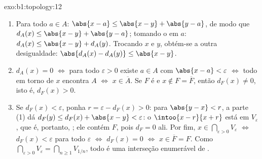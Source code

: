 \begin{solution}{exo:b1:topology:12}
\begin{enumerate}
  \item Para todo $a \in A$: $\abs{x - a} \leq \abs{x - y} +
        \abs{y - a}$, de modo que $d_A(x) \leq \abs{x - y} + \abs{y - a}$;
        tomando o  em $a$: $d_A(x) \leq \abs{x - y} +
        d_A(y)$. Trocando $x$ e $y$, obtém-se a outra
        desigualdade: $\abs{d_A(x) - d_A(y)} \leq \abs{x - y}$.
  \item $d_A(x) = 0$ $\iff$ para todo $\varepsilon > 0$ existe
        $a \in A$ com $\abs{x - a} < \varepsilon$ $\iff$ todo
         em torno de $x$ encontra $A$ $\iff$ $x \in \overline A$.
        Se $F$ é  e $x \notin F = \overline F$, então
        $d_F(x) \neq 0$, isto é, $d_F(x) > 0$.
  \item Se $d_F(x) < \varepsilon$, ponha $r = \varepsilon -
        d_F(x) > 0$: para $\abs{y - x} < r$, a parte (1) dá
        $d_F(y) \leq d_F(x) + \abs{x - y} < \varepsilon$: o
         $\intoo{x - r}{x + r}$ está em $V_\varepsilon$,
        que é, portanto, ; ele contém $F$, pois $d_F = 0$
        ali. Por fim, $x \in \bigcap_{\varepsilon>0}
        V_\varepsilon$ $\iff$ $d_F(x) < \varepsilon$ para todo
        $\varepsilon$ $\iff$ $d_F(x) = 0$ $\iff$ $x \in \overline
        F = F$. Como $\bigcap_{\varepsilon > 0} V_\varepsilon =
        \bigcap_{n \geq 1} V_{1/n}$, todo  é uma
        interseção enumerável de .
\end{enumerate}
\end{solution}

